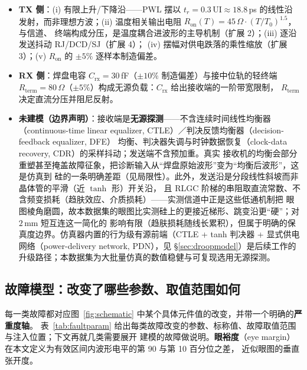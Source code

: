 \documentclass[11pt,a4paper,fontset=mac]{ctexart}
\newcommand{\term}[1]{\textbf{#1}}
\begin{document}
\begin{itemize}
\item \textbf{TX 侧}：(i) 有限上升/下降沿——PWL 摆以 $t_r=0.3\,\mathrm{UI}\approx18.8\,$ps 的线性沿
发射，而非理想方波；(ii) 温度相关输出电阻 $R_\text{on}(T)=45\,\Omega\cdot(T/T_0)^{1.5}$，与信道、
终端构成分压，是温度耦合进波形的主导机制（扩展 2）；(iii) 逐沿发送抖动 RJ/DCD/SJ（扩展 4）；
(iv) 摆幅对供电跌落的乘性缩放（扩展 3）；(v) $R_\text{on}$ 的 $\pm5\%$ 逐样本制造偏差。
\item \textbf{RX 侧}：焊盘电容 $C_\text{rx}{=}30\,$fF（$\pm10\%$ 制造偏差）与接中位轨的轻终端
$R_\text{term}{=}80\,\Omega$（$\pm5\%$）构成无源负载：$C_\text{rx}$ 给出接收端的一阶带宽限制，
$R_\text{term}$ 决定直流分压并阻尼反射。
\item \textbf{未建模（边界声明）}：接收端是\textbf{无源探测}——不含连续时间线性均衡器
（continuous-time linear equalizer, CTLE）／判决反馈均衡器（decision-feedback equalizer, DFE）
均衡、判决器失调与时钟数据恢复（clock-data recovery, CDR）的采样抖动；发送端不含预加重。真实
接收机的均衡会部分重塑甚至掩盖故障征象，把诊断输入从“焊盘原始波形”变为“均衡后波形”，这是仿真到
硅的一条明确差距（见局限性）。此外，发送沿是分段线性斜坡而非晶体管的平滑（近 $\tanh$ 形）开关沿，
且 RLGC 阶梯的串阻取直流常数、不含频变损耗（趋肤效应、介质损耗）——实测信道中正是这些低通机制把
眼图棱角磨圆，故本数据集的眼图比实测硅上的更接近梯形、跳变沿更“硬”；对 $2\,$mm 短互连这一简化的
影响有限（趋肤损耗随线长累积），但属于明确的保真度边界。仿真器内置的行为级有源前端（CTLE +
tanh 判决器 + 显式供电网络（power-delivery network, PDN），见 \S\ref{sec:droopmodel}）是后续工作的
升级路径；本数据集为大批量仿真的数值稳健与可复现选用无源探测。
\end{itemize}

\subsection{故障模型：改变了哪些参数、取值范围如何}
每一类故障都对应图~\ref{fig:schematic} 中某个具体元件值的改变，并带一个明确的\textbf{严重度轴}。
表~\ref{tab:faultparam} 给出每类故障改变的参数、标称值、故障取值范围与注入位置；下文再就几类需要展开
建模的故障做说明。\term{眼裕度}（eye margin）在本文定义为有效区间内波形电平的第 90 与第 10 百分位之差，
近似眼图的垂直张开度。
\end{document}
